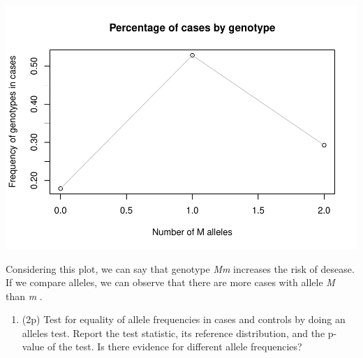\documentclass[
]{article}
\providecommand{\tightlist}{%
  \setlength{\itemsep}{0pt}\setlength{\parskip}{0pt}}
\begin{document}
\includegraphics{P062020_Association_analysis_files/figure-latex/second-1.pdf}

Considering this plot, we can say that genotype \emph{Mm} increases the
risk of desease. If we compare alleles, we can observe that there are
more cases with allele \emph{M} than \emph{m} .

\begin{enumerate}
\def\labelenumi{\arabic{enumi}.}
\setcounter{enumi}{2}
\tightlist
\item
  (2p) Test for equality of allele frequencies in cases and controls by
  doing an alleles test. Report the test statistic, its reference
  distribution, and the p-value of the test. Is there evidence for
  different allele frequencies?
\end{enumerate}
\end{document}
